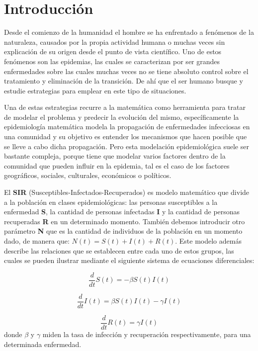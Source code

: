\documentclass{article}
\begin{document}
    \section{Introducción}
    
    Desde el comienzo de la humanidad el hombre se ha enfrentado a fenómenos de la naturaleza, causados por la propia actividad humana o muchas veces sin explicación de su origen desde el punto de vista científico. Uno de estos fenómenos son las epidemias, las cuales se caracterizan por ser grandes enfermedades sobre las cuales muchas veces no se tiene absoluto control sobre el tratamiento y eliminación de la transición. De ahí que el ser humano busque y estudie estrategias para emplear en este tipo de situaciones.
    
    Una de estas estrategias recurre a la matemática como herramienta para tratar de modelar el problema y predecir la evolución del mismo, específicamente la epidemiología matemática modela la propagación de enfermedades infecciosas en una comunidad y su objetivo es entender los mecanismos que hacen posible que se lleve a cabo dicha propagación. Pero esta modelación epidemiológica suele ser bastante compleja, porque tiene que modelar varios factores dentro de la comunidad que pueden influir en la epidemia, tal es el caso de los factores geográficos, sociales, culturales, económicos o políticos.
    
    El \textbf{SIR} (Susceptibles-Infectados-Recuperados) es modelo matemático que divide a la población en clases epidemiológicas: las personas susceptibles a la enfermedad \textbf{S}, la cantidad de personas infectadas \textbf{I} y la cantidad de personas recuperadas \textbf{R} en un determinado momento. También debemos introducir otro parámetro \textbf{N} que es la cantidad de individuos de la población en un momento dado, de manera que: $N(t)=S(t)+I(t)+R(t)$. Este modelo además describe las relaciones que se establecen entre cada uno de estos grupos, las cuales se pueden ilustrar mediante el siguiente sistema de ecuaciones diferenciales:
       
    \begin{equation}
    		\dfrac{d}{dt}S(t)=-\beta S(t)I(t)
    \end{equation}
    
    \begin{equation}
    		\dfrac{d}{dt}I(t)=\beta S(t)I(t)-\gamma I(t)
    \end{equation}
    
    \begin{equation}
   		\dfrac{d}{dt}R(t)=\gamma I(t) 
    \end{equation}
donde $\beta$ y $\gamma$ miden la tasa de infección y recuperación respectivamente, para una determinada enfermedad. 
\end{document}
